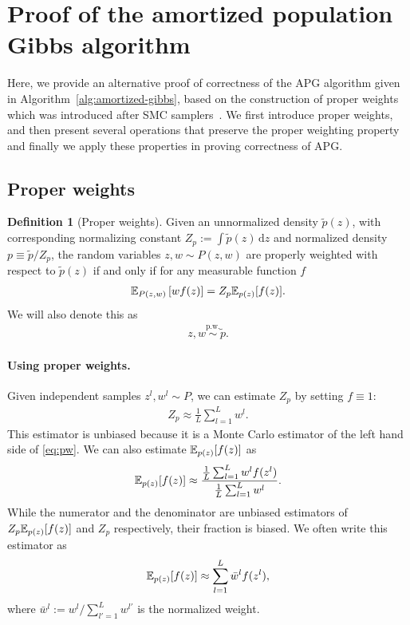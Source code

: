 \documentclass{article}
\theoremstyle{definition}
\newtheorem{definition}{Definition}
\newcommand{\pw}{\overset{\text{p.w.}}{\sim}
}
\begin{document}
\section{Proof of the amortized population Gibbs algorithm}
\label{appendix:proof-algo}

Here, we provide an alternative proof of correctness of the APG algorithm given in Algorithm~\ref{alg:amortized-gibbs}, based on the construction of proper weights~\cite{naesseth2015nested} which was introduced after SMC samplers~\cite{delmoral2006sequential}.
We first introduce proper weights, and then present several operations that preserve the proper weighting property and finally we apply these properties in proving correctness of APG.

\subsection{Proper weights}

\begin{definition}[Proper weights]
    Given an unnormalized density $\tilde p(z)$, with corresponding normalizing constant $Z_p := \int \tilde p(z) \,\mathrm dz$ and normalized density $p \equiv \tilde p / Z_p$, the random variables $z, w \sim P(z, w)$ are properly weighted with respect to $\tilde p(z)$ if and only if for any measurable function $f$
    \begin{align}
    \label{eq:pw}
    \mathbb{E}_{P(z, w)}\left[w f(z)\right] = Z_p \mathbb{E}_{p(z)}[f(z)]. 
    \end{align}
    We will also denote this as
    \begin{align*}
        z, w \pw \tilde p.
    \end{align*}
\end{definition}

\paragraph{Using proper weights.}
Given independent samples $z^l, w^l \sim P$, we can estimate $Z_p$ by setting $f \equiv 1$:
\begin{align*}
    Z_p \approx \frac{1}{L} \sum_{l = 1}^L w^l.
\end{align*}
This estimator is unbiased because it is a Monte Carlo estimator of the left hand side of \eqref{eq:pw}.
We can also estimate $\mathbb{E}_{p(z)}[f(z)]$ as
\begin{align*}
    \mathbb{E}_{p(z)}[f(z)] \approx \frac{\frac{1}{L} \sum_{l = 1}^L w^l f(z^l)}{\frac{1}{L} \sum_{l = 1}^L w^l}.
\end{align*}
While the numerator and the denominator are unbiased estimators of $Z_p \mathbb{E}_{p(z)}[f(z)]$ and $Z_p$ respectively, their fraction is biased.
We often write this estimator as
\begin{align}
    \mathbb{E}_{p(z)}[f(z)] \approx \sum_{l = 1}^L \bar w^l f(z^l), \label{eq:pw-estimation}
\end{align}
where $\bar w^l := w^l / \sum_{l' = 1}^L w^{l'}$ is the normalized weight.
\end{document}
